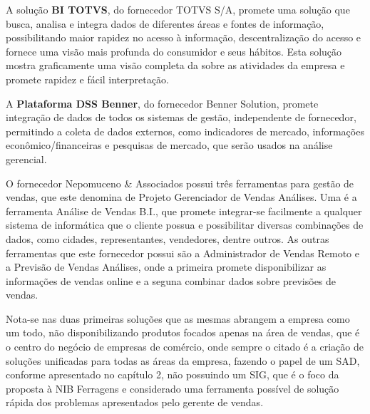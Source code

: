\documentclass[a4paper]{article}
\begin{document}
{
\textsf{A solu\c{c}\~ao }\textsf{\textbf{BI TOTVS}}\textsf{, do fornecedor TOTVS S/A, promete uma solu\c{c}\~ao que
busca, analisa e integra dados de diferentes \'areas e fontes de informa\c{c}\~ao, possibilitando maior rapidez no
acesso \`a informa\c{c}\~ao, descentraliza\c{c}\~ao do acesso e fornece uma vis\~ao mais profunda do consumidor e seus
h\'abitos. Esta solu\c{c}\~ao mostra graficamente uma vis\~ao completa da sobre as atividades da empresa e promete
rapidez e f\'acil interpreta\c{c}\~ao.}}

{
\textsf{A }\textsf{\textbf{Plataforma DSS Benner}}\textsf{, do fornecedor Benner Solution, promete integra\c{c}\~ao de
dados de todos os sistemas de gest\~ao, independente de fornecedor, permitindo a coleta de dados externos, como
indicadores de mercado, informa\c{c}\~oes econ\^omico/financeiras e pesquisas de mercado, que ser\~ao usados na
an\'alise gerencial.}}

{
\textsf{O fornecedor Nepomuceno \& Associados possui tr\^es ferramentas para gest\~ao de vendas, que este denomina de
Projeto Gerenciador de Vendas An\'alises. Uma \'e a ferramenta An\'alise de Vendas B.I., que promete integrar-se
facilmente a qualquer sistema de inform\'atica que o cliente possua e possibilitar diversas combina\c{c}\~oes de dados,
como cidades, representantes, vendedores, dentre outros. As outras ferramentas que este fornecedor possui s\~ao a
Administrador de Vendas Remoto e a Previs\~ao de Vendas An\'alises, onde a primeira promete disponibilizar as
informa\c{c}\~oes de vendas online e a seguna combinar dados sobre previs\~oes de vendas.}}

{
\textsf{Nota-se nas duas primeiras solu\c{c}\~oes que as mesmas abrangem a empresa como um todo, n\~ao disponibilizando
produtos focados apenas na \'area de vendas, que \'e o centro do neg\'ocio de empresas de com\'ercio, onde sempre o
citado \'e a cria\c{c}\~ao de solu\c{c}\~oes unificadas para todas as \'areas da empresa, fazendo o papel de um SAD,
conforme apresentado no cap\'itulo 2, n\~ao possuindo um SIG, que \'e o foco da }\textsf{proposta \`a NIB Ferragens e
considerado uma ferramenta poss\'ivel de solu\c{c}\~ao r\'apida dos problemas apresentados pelo gerente de vendas.}}
\end{document}
